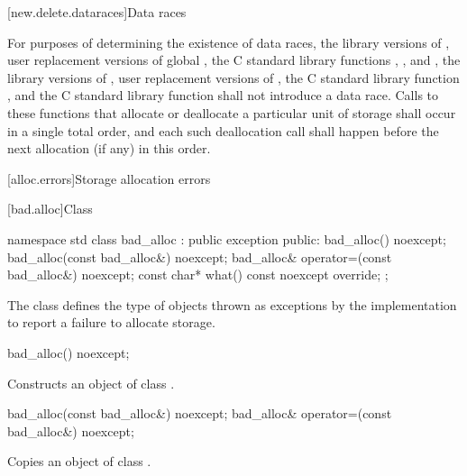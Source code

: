 [new.delete.dataraces]{Data races}

\pnum
For purposes of determining the existence of data races, the library versions
of , user replacement versions of global ,
the C standard library functions
, , and ,
the library
versions of , user replacement
versions of , the C standard library function
, and the C standard library function  shall not
introduce a data race.
Calls to these functions that allocate or deallocate a particular unit
of storage shall occur in a single total order, and each such deallocation call
shall happen before the next allocation (if any) in
this order.

[alloc.errors]{Storage allocation errors}

%
[bad.alloc]{Class }

\begin{codeblock}
namespace std {
  class bad_alloc : public exception {
  public:
    bad_alloc() noexcept;
    bad_alloc(const bad_alloc&) noexcept;
    bad_alloc& operator=(const bad_alloc&) noexcept;
    const char* what() const noexcept override;
  };
}
\end{codeblock}

\pnum
The class
defines the type of objects thrown as
exceptions by the implementation to report a failure to allocate storage.

%
\begin{itemdecl}
bad_alloc() noexcept;
\end{itemdecl}

\begin{itemdescr}
\pnum
\effects
Constructs an object of class
.
\end{itemdescr}

%
%
\begin{itemdecl}
bad_alloc(const bad_alloc&) noexcept;
bad_alloc& operator=(const bad_alloc&) noexcept;
\end{itemdecl}

\begin{itemdescr}
\pnum
\effects
Copies an object of class
.
\end{itemdescr}

